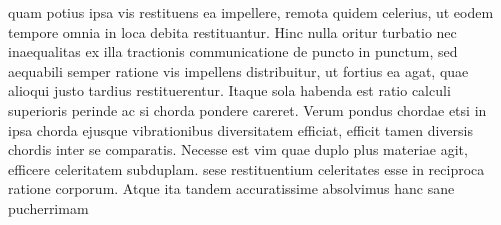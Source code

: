 quam potius ipsa vis restituens\protect{}
ea impellere, remota quidem celerius,
ut eodem tempore\protect{}
omnia in loca debita restituantur.
Hinc nulla oritur turbatio\protect{}
nec inaequalitas\protect{}
ex illa tractionis communicatione%
\protect{} de puncto in punctum,
sed aequabili semper ratione vis impellens%
\protect{} distribuitur,
ut fortius ea agat,
quae alioqui justo tardius restituerentur.
Itaque sola habenda est
ratio calculi\protect{} superioris
perinde ac si chorda\protect{}
pondere\protect{} careret.
Verum pondus chordae\protect{}
etsi in ipsa chorda ejusque vibrationibus\protect{}
diversitatem\protect{} efficiat,
efficit tamen diversis chordis inter se comparatis.
Necesse est vim\protect{}
quae duplo plus materiae\protect{} agit,
efficere celeritatem\protect{} subduplam.
sese restituentium celeritates\protect{}
esse in reciproca ratione corporum.\protect{}
\pend%
%
\pstart%
Atque ita tandem accuratissime absolvimus hanc sane pucherrimam
